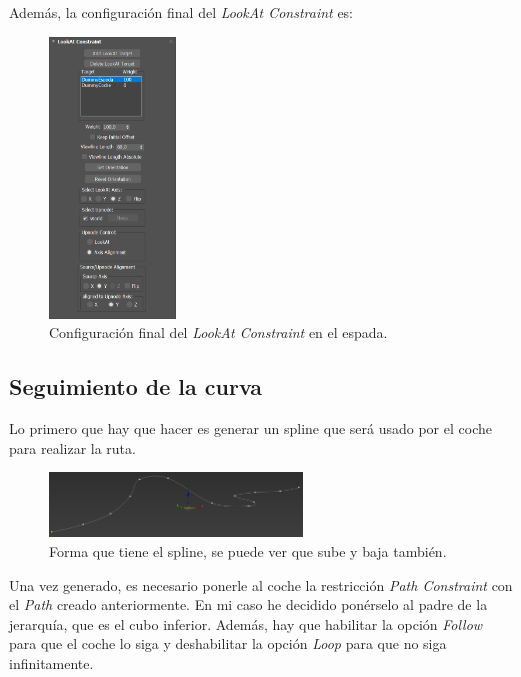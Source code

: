\newpage

Además, la configuración final del \textit{LookAt Constraint} es:

\begin{figure}[H]
    \centering
   \includegraphics[width=0.3\textwidth]{imagenes/espada/lookatconfig.png}
   \caption{Configuración final del \textit{LookAt Constraint} en el espada.}
\end{figure}

\subsection{Seguimiento de la curva}

Lo primero que hay que hacer es generar un spline que será usado por el coche para realizar la ruta.

\begin{figure}[H]
    \centering
   \includegraphics[width=0.6\textwidth]{imagenes/spline/spline.png}
   \caption{Forma que tiene el spline, se puede ver que sube y baja también.}
\end{figure}

Una vez generado, es necesario ponerle al coche la restricción \textit{Path Constraint} con el \textit{Path} creado anteriormente. En mi caso he decidido ponérselo al padre de la jerarquía, que es el cubo inferior. Además, hay que habilitar la opción \textit{Follow} para que el coche lo siga y deshabilitar la opción \textit{Loop} para que no siga infinitamente.

